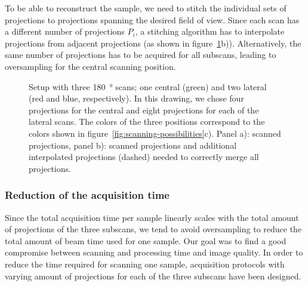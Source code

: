 To be able to reconstruct the sample, we need to stitch the individual sets of projections to projections spanning the desired field of view. Since each scan has a different number of projections $P_{i}$, a stitching algorithm has to interpolate projections from adjacent projections (as shown in figure~\ref{fig:projections}b)). Alternatively, the same number of projections has to be acquired for all subscans, leading to oversampling for the central scanning position.

\ifiucr
	\begin{figure}%
		\caption{Setup with three \SI{180}{\degree} scans; one central (green) and two lateral (red and blue, respectively). In this drawing, we chose four projections for the central and eight projections for each of the lateral scans. The colors of the three positions correspond to the colors shown in figure~\ref{fig:scanning-possibilities}c). Panel a): scanned projections, panel b): scanned projections and additional interpolated projections (dashed) needed to correctly merge all projections.}%
		\label{fig:projections}%
	\end{figure}%
\else
	\begin{figure*}[htp]
		\centering
		\subfloat[]{%
			\label{subfig:ProjectionSetup}%
			}%
		\subfloat[]{%
			\label{subfig:ProjectionSetupInterpolate}%
			}%
		\caption{Setup with one central (green) and two lateral scans (red and blue, respectively). For demonstration purposes, the central scan has four projections and the lateral scans have eight projections each (all acquired over \SI{180}{\degree}). The colors of the three positions correspond to the colors shown in figure~\ref{subfig:scanning-possibilities}. : scanned projections, : scanned projections and additional interpolated projections (dashed) needed to correctly merge all projections.}
		\label{fig:projections}
	\end{figure*}
\fi

\subsubsection{Reduction of the acquisition time}%
Since the total acquisition time per sample linearly scales with the total amount of projections of the three subscans, we tend to avoid oversampling to reduce the total amount of beam time used for one sample. Our goal was to find a good compromise between scanning and processing time and image quality. In order to reduce the time required for scanning one sample, acquisition protocols with varying amount of projections for each of the three subscans have been designed.

